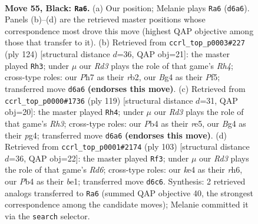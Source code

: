 \documentclass[11pt]{article}
\begin{document}
\clearpage

\begin{figure}[p]\centering
\begin{subfigure}{0.46\textwidth}\centering
\resizebox{\linewidth}{!}{%
\newchessgame
\chessboard[
  setfen={8/7p/3r1k2/4p3/1p2K1b1/8/4n1r1/8 b - - 1 55},
  showmover=false,
  pgfstyle=straightmove, color=movearrow, markmove={d6-a6}
]}
\caption{}
\end{subfigure}\hfill
\begin{subfigure}{0.46\textwidth}\centering
\resizebox{\linewidth}{!}{%
\newchessgame
\chessboard[
  setfen={8/7k/7P/5P2/5K1R/8/1r6/8 w - - 5 63},
  showmover=false,
  pgfstyle=straightmove, color=movearrow, markmove={h4-h3}
]}
\caption{}
\end{subfigure}
\\[4pt]
\begin{subfigure}{0.46\textwidth}\centering
\resizebox{\linewidth}{!}{%
\newchessgame
\chessboard[
  setfen={8/5p1k/7r/4R3/6P1/7p/5P1K/8 b - - 1 60},
  showmover=false,
  pgfstyle=straightmove, color=movearrow, markmove={h6-h4}
]}
\caption{}
\end{subfigure}\hfill
\begin{subfigure}{0.46\textwidth}\centering
\resizebox{\linewidth}{!}{%
\newchessgame
\chessboard[
  setfen={8/8/7R/3kp3/8/3r3p/7K/4B3 b - - 5 52},
  showmover=false,
  pgfstyle=straightmove, color=movearrow, markmove={d3-f3}
]}
\caption{}
\end{subfigure}
\caption{\textbf{Move 55, Black: \texttt{Ra6}.} (a) Our position; Melanie plays \texttt{Ra6} (\texttt{d6a6}). Panels (b)--(d) are the retrieved master positions whose correspondence most drove this move (highest QAP objective among those that transfer to it). (b) Retrieved from \texttt{ccrl\_top\_p0003\#227} (ply 124) [structural distance $d$=36, QAP obj=21]: the master played \texttt{Rh3}; under $\mu$ our \emph{Rd3} plays the role of that game's \emph{Rh4}; cross-type roles: our \emph{P}h7 as their \emph{r}b2, our \emph{B}g4 as their \emph{P}f5; transferred move \texttt{d6a6} \textbf{(endorses this move)}. (c) Retrieved from \texttt{ccrl\_top\_p0000\#1736} (ply 119) [structural distance $d$=31, QAP obj=20]: the master played \texttt{Rh4}; under $\mu$ our \emph{Rd3} plays the role of that game's \emph{Rh3}; cross-type roles: our \emph{P}b4 as their \emph{r}e5, our \emph{B}g4 as their \emph{p}g4; transferred move \texttt{d6a6} \textbf{(endorses this move)}. (d) Retrieved from \texttt{ccrl\_top\_p0001\#2174} (ply 103) [structural distance $d$=36, QAP obj=22]: the master played \texttt{Rf3}; under $\mu$ our \emph{Rd3} plays the role of that game's \emph{Rd6}; cross-type roles: our \emph{k}e4 as their \emph{r}h6, our \emph{P}b4 as their \emph{b}e1; transferred move \texttt{d6c6}. Synthesis: 2 retrieved analogs transferred to \texttt{Ra6} (summed QAP objective 40, the strongest correspondence among the candidate moves); Melanie committed it via the \texttt{search} selector.}
\label{fig:thought-m109}
\end{figure}
\end{document}

